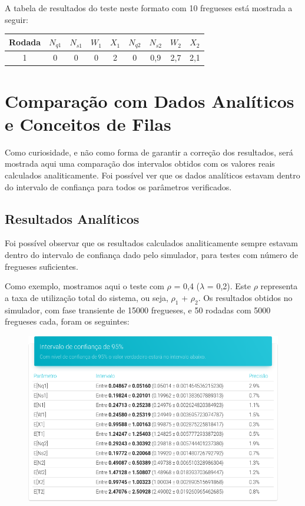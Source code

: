 \documentclass[a4paper,12pt]{report}
\begin{document}
A tabela de resultados do teste neste formato com 10 fregueses está mostrada a seguir:
\vspace{-1em}
\begin{center}
\begin{tabular}{ c c c c c c c c c }
  \hline
  \textbf{Rodada} & $N_{q1}$ & $N_{s1}$ & $W_1$ & $X_1$ & $N_{q2}$ & $N_{s2}$ & $W_2$ & $X_2$ \\
  \hline
  1 & 0 & 0 & 0 & 2 & 0 & 0,9 & 2,7 & 2,1 \\
  \hline
\end{tabular}
\end{center}


\section{Comparação com Dados Analíticos e Conceitos de Filas}

Como curiosidade, e não como forma de garantir a correção dos resultados, será mostrada aqui uma comparação dos intervalos obtidos com os valores reais calculados analiticamente. Foi possível ver que os dados analíticos estavam dentro do intervalo de confiança para todos os parâmetros verificados.

\subsection{Resultados Analíticos}

Foi possível observar que os resultados calculados analiticamente sempre estavam dentro do intervalo de confiança dado pelo simulador, para testes com número de fregueses suficientes.

Como exemplo, mostramos aqui o teste com $\rho$ = 0,4 ($\lambda$ = 0,2). Este $\rho$ representa a taxa de utilização total do sistema, ou seja, $\rho_1$ + $\rho_2$. Os resultados obtidos no simulador, com fase transiente de 15000 fregueses, e 50 rodadas com 5000 fregueses cada, foram os seguintes:

\begin{figure}[H]
\includegraphics[width=1\textwidth]{./graficos/resultados_simulador_ic.png}
\end{figure}
\end{document}
